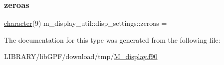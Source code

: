 \mbox{\label{structm__display__util_1_1disp__settings_aaa58e0709e4c91aefef6739c7a500079}} 
\subsubsection{\texorpdfstring{zeroas}{zeroas}}
{\footnotesize\ttfamily \hyperlink{option__stopwatch_83_8txt_abd4b21fbbd175834027b5224bfe97e66}{character}(9) m\+\_\+display\+\_\+util\+::disp\+\_\+settings\+::zeroas = \textquotesingle{}\textquotesingle{}\hspace{0.3cm}{\ttfamily [private]}}



The documentation for this type was generated from the following file\+:\begin{DoxyCompactItemize}
\item 
L\+I\+B\+R\+A\+R\+Y/lib\+G\+P\+F/download/tmp/\hyperlink{M__display_8f90}{M\+\_\+display.\+f90}\end{DoxyCompactItemize}
